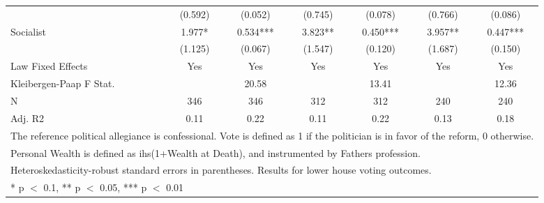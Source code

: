 \begin{table}
\begin{tabular}[t]{lcccccc}
 & (\num{0.592}) & (\num{0.052}) & (\num{0.745}) & (\num{0.078}) & (\num{0.766}) & (\num{0.086})\\
Socialist & \num{1.977}* & \num{0.534}*** & \num{3.823}** & \num{0.450}*** & \num{3.957}** & \num{0.447}***\\
 & (\num{1.125}) & (\num{0.067}) & (\num{1.547}) & (\num{0.120}) & (\num{1.687}) & (\num{0.150})\\
\midrule
Law Fixed Effects & Yes & Yes & Yes & Yes & Yes & Yes\\
Kleibergen-Paap F Stat. &  & 20.58 &  & 13.41 &  & 12.36\\
N & \num{346} & \num{346} & \num{312} & \num{312} & \num{240} & \num{240}\\
Adj. R2 & \num{0.11} & \num{0.22} & \num{0.11} & \num{0.22} & \num{0.13} & \num{0.18}\\
\bottomrule
\multicolumn{7}{l}{\rule{0pt}{1em}The reference political allegiance is confessional. Vote is defined as 1 if the politician is in favor of the reform, 0 otherwise.}\\
\multicolumn{7}{l}{\rule{0pt}{1em}Personal Wealth is defined as ihs(1+Wealth at Death), and instrumented by Fathers profession.}\\
\multicolumn{7}{l}{\rule{0pt}{1em}Heteroskedasticity-robust standard errors in parentheses. Results for lower house voting outcomes.}\\
\multicolumn{7}{l}{\rule{0pt}{1em}* p $<$ 0.1, ** p $<$ 0.05, *** p $<$ 0.01}\\
\end{tabular}
\end{table}
